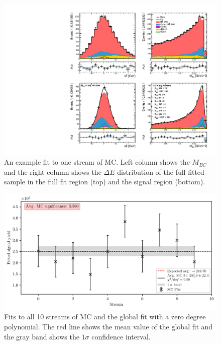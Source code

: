 \begin{figure}[H]
	\centering
	\captionsetup{width=0.8\linewidth}
	\includegraphics[width=\linewidth]{fig/sig_fit_mc}
	\caption{An example fit to one stream of MC. Left column shows the $M_{BC}$ and the right column shows the $\Delta E$ distribution of the full fitted sample in the full fit region (top) and the signal region (bottom).}
	\label{fig:sig_streamfit}
\end{figure}

\begin{figure}[H]
	\centering
	\captionsetup{width=0.8\linewidth}
	\includegraphics[width=\linewidth]{fig/sig_global_mc}
	\caption{Fits to all 10 streams of MC and the global fit with a zero degree polynomial. The red line shows the mean value of the global fit and the gray band shows the $1\sigma$ confidence interval.}
	\label{fig:sig_global}
\end{figure}

